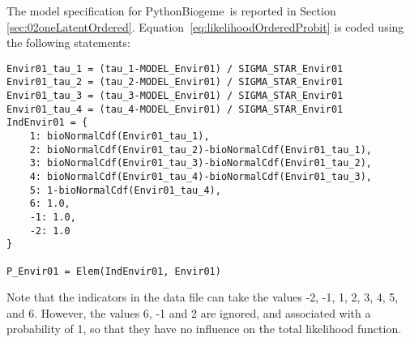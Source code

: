 \documentclass[12pt,a4paper]{article}
\newcommand{\PBIOGEME}{PythonBiogeme}
\begin{document}
The model specification for \PBIOGEME\ is reported in Section
\ref{sec:02oneLatentOrdered}. Equation~\ref{eq:likelihoodOrderedProbit}
is coded using the following statements:
\begin{lstlisting}
Envir01_tau_1 = (tau_1-MODEL_Envir01) / SIGMA_STAR_Envir01
Envir01_tau_2 = (tau_2-MODEL_Envir01) / SIGMA_STAR_Envir01
Envir01_tau_3 = (tau_3-MODEL_Envir01) / SIGMA_STAR_Envir01
Envir01_tau_4 = (tau_4-MODEL_Envir01) / SIGMA_STAR_Envir01
IndEnvir01 = {
    1: bioNormalCdf(Envir01_tau_1),
    2: bioNormalCdf(Envir01_tau_2)-bioNormalCdf(Envir01_tau_1),
    3: bioNormalCdf(Envir01_tau_3)-bioNormalCdf(Envir01_tau_2),
    4: bioNormalCdf(Envir01_tau_4)-bioNormalCdf(Envir01_tau_3),
    5: 1-bioNormalCdf(Envir01_tau_4),
    6: 1.0,
    -1: 1.0,
    -2: 1.0
}

P_Envir01 = Elem(IndEnvir01, Envir01)
\end{lstlisting}
Note that the indicators in the data file can take the values -2, -1, 1, 2,
3, 4, 5, and 6. However, the values 6, -1 and 2 are ignored, and
associated with a probability of 1, so that they have no influence on
the total likelihood function.
\end{document}
